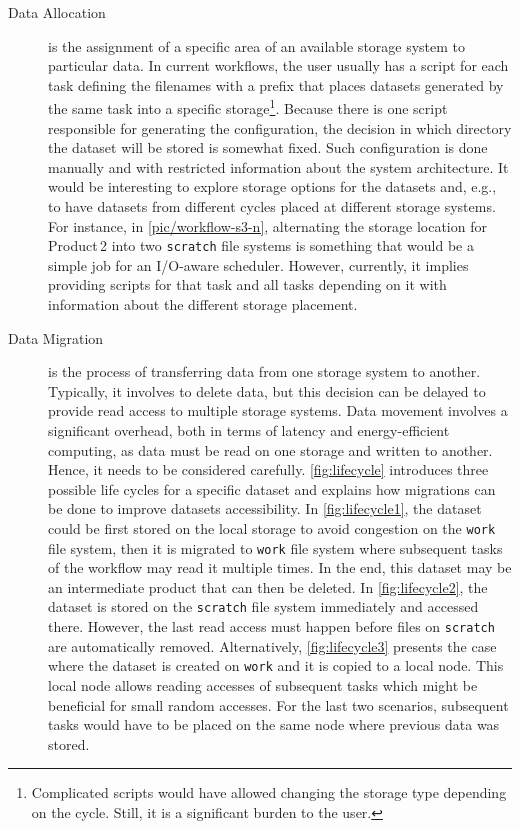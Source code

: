 \documentclass{superfri}
\begin{document}
\begin{description}

\item[Data Allocation] is the assignment of a specific area of an available storage system to particular data.
In current workflows, the user usually has a script for each task defining the filenames with a prefix that places datasets generated by the same task into a specific storage\footnote{Complicated scripts would have allowed changing the storage type depending on the cycle. Still, it is a significant burden to the user.}.
Because there is one script responsible for generating the configuration, the decision in which directory the dataset will be stored is somewhat fixed.
Such configuration is done manually and with restricted information about the system architecture.
It would be interesting to explore storage options for the datasets and, e.g., to have datasets from different cycles placed at different storage systems.
For instance, in \cref{pic/workflow-s3-n}, alternating the storage location for Product\,2 into two \texttt{scratch} file systems is something that would be a simple job for an I/O-aware scheduler.
However, currently, it implies providing scripts for that task and all tasks depending on it with information about the different storage placement.

\item[Data Migration] is the process of transferring data from one storage system to another. Typically, it involves to delete data, but this decision can be delayed to provide read access to multiple storage systems.
Data movement involves a significant overhead, both in terms of latency and energy-efficient computing, as data must be read on one storage and written to another.
Hence, it needs to be considered carefully.
\cref{fig:lifecycle} introduces three possible life cycles for a specific dataset and explains how migrations can be done to improve datasets accessibility.
In \cref{fig:lifecycle1}, the dataset could be first stored on the local storage to avoid congestion on the \texttt{work} file system, then it is migrated to \texttt{work} file system where subsequent tasks of the workflow may read it multiple times.
In the end, this dataset may be an intermediate product that can then be deleted.
In \cref{fig:lifecycle2}, the dataset is stored on the \texttt{scratch} file system immediately and accessed there.
However, the last read access must happen before files on \texttt{scratch} are automatically removed.
Alternatively, \cref{fig:lifecycle3} presents the case where the dataset is created on \texttt{work} and it is copied to a local node.
This local node allows reading accesses of subsequent tasks which might be beneficial for small random accesses.
For the last two scenarios, subsequent tasks would have to be placed on the same node where previous data was stored.


\end{description}
\end{document}
